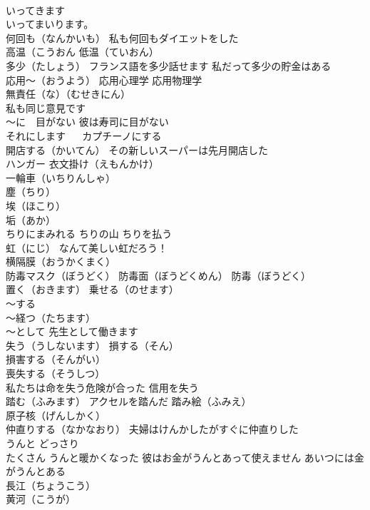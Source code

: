 \documentclass[8pt]{extreport}
\begin{document}
\begin{CJK}{UTF8}{min}
\\	いってきます　
\\	いってまいります。
\\	何回も（なんかいも） 私も何回もダイエットをした
\\	高温（こうおん 低温（ていおん）
\\	多少（たしょう） フランス語を多少話せます 私だって多少の貯金はある
\\	応用～（おうよう） 応用心理学 応用物理学
\\	無責任（な）（むせきにん）
\\	私も同じ意見です
\\	～に　目がない 彼は寿司に目がない
\\	それにします 　 カプチーノにする
\\	開店する（かいてん） その新しいスーパーは先月開店した
\\	ハンガー 衣文掛け（えもんかけ）
\\	一輪車（いちりんしゃ）
\\	塵（ちり） 
\\	埃（ほこり） 
\\	垢（あか） 
\\	ちりにまみれる ちりの山 ちりを払う
\\	虹（にじ） なんて美しい虹だろう！
\\	横隔膜（おうかくまく）
\\	防毒マスク（ぼうどく） 防毒面（ぼうどくめん） 防毒（ぼうどく）
\\	置く（おきます） 乗せる（のせます）
\\	～する 
\\	～経つ（たちます）
\\	～として 先生として働きます
\\	失う（うしないます） 損する（そん）
\\	損害する（そんがい） 
\\	喪失する（そうしつ） 
\\	私たちは命を失う危険が合った 信用を失う
\\	踏む（ふみます） アクセルを踏んだ 踏み絵（ふみえ）
\\	原子核（げんしかく）
\\	仲直りする（なかなおり） 夫婦はけんかしたがすぐに仲直りした
\\	うんと どっさり 
\\	たくさん うんと暖かくなった 彼はお金がうんとあって使えません あいつには金がうんとある
\\	長江（ちょうこう） 
\\	黄河（こうが）

\end{CJK}
\end{document}
